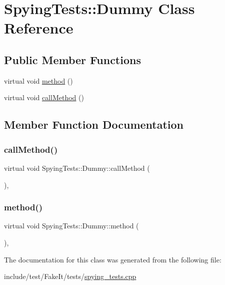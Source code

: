 \hypertarget{classSpyingTests_1_1Dummy}{}\section{Spying\+Tests\+::Dummy Class Reference}
\label{classSpyingTests_1_1Dummy}
\subsection*{Public Member Functions}
\begin{DoxyCompactItemize}
\item 
virtual void \mbox{\hyperlink{classSpyingTests_1_1Dummy_afff0b8b8b57d355bfda28045554878df}{method}} ()
\item 
virtual void \mbox{\hyperlink{classSpyingTests_1_1Dummy_aa56f336c8a964bfd179df8d06acf0a69}{call\+Method}} ()
\end{DoxyCompactItemize}


\subsection{Member Function Documentation}
\mbox{\label{classSpyingTests_1_1Dummy_aa56f336c8a964bfd179df8d06acf0a69}} 
\subsubsection{\texorpdfstring{callMethod()}{callMethod()}}
{\footnotesize\ttfamily virtual void Spying\+Tests\+::\+Dummy\+::call\+Method (\begin{DoxyParamCaption}{ }\end{DoxyParamCaption})\hspace{0.3cm}{\ttfamily [inline]}, {\ttfamily [virtual]}}

\mbox{\label{classSpyingTests_1_1Dummy_afff0b8b8b57d355bfda28045554878df}} 
\subsubsection{\texorpdfstring{method()}{method()}}
{\footnotesize\ttfamily virtual void Spying\+Tests\+::\+Dummy\+::method (\begin{DoxyParamCaption}{ }\end{DoxyParamCaption})\hspace{0.3cm}{\ttfamily [inline]}, {\ttfamily [virtual]}}



The documentation for this class was generated from the following file\+:\begin{DoxyCompactItemize}
\item 
include/test/\+Fake\+It/tests/\mbox{\hyperlink{spying__tests_8cpp}{spying\+\_\+tests.\+cpp}}\end{DoxyCompactItemize}

